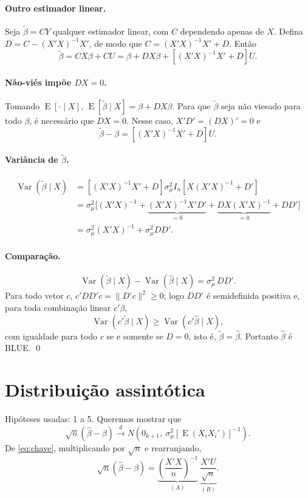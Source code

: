 \documentclass[12pt,a4paper]{article}
\newcommand{\E}{\operatorname{E}}
\newcommand{\Var}{\operatorname{Var}}
\newcommand{\convd}{\xrightarrow{\;d\;}}
\begin{document}
\paragraph{Outro estimador linear.} Seja $\tilde\beta=CY$ qualquer estimador linear, com $C$ dependendo apenas de $X$. Defina $D=C-(X'X)^{-1}X'$, de modo que $C=(X'X)^{-1}X'+D$. Então
\[
  \tilde\beta = CX\beta+CU=\beta+DX\beta+\left[(X'X)^{-1}X'+D\right]U .
\]

\paragraph{Não-viés impõe $DX=0$.} Tomando $\E[\cdot\mid X]$, $\E[\tilde\beta\mid X]=\beta+DX\beta$. Para que $\tilde\beta$ seja não viesado para todo $\beta$, é necessário que $DX=0$. Nesse caso, $X'D'=(DX)'=0$ e
\[
  \tilde\beta-\beta=\left[(X'X)^{-1}X'+D\right]U .
\]

\paragraph{Variância de $\tilde\beta$.}
\begin{align*}
  \Var(\tilde\beta\mid X)
  &=\left[(X'X)^{-1}X'+D\right]\sigma_\mu^2 I_n\left[X(X'X)^{-1}+D'\right]\\
  &=\sigma_\mu^2\Big[(X'X)^{-1}+\underbrace{(X'X)^{-1}X'D'}_{=0}+\underbrace{DX(X'X)^{-1}}_{=0}+DD'\Big]\\
  &=\sigma_\mu^2(X'X)^{-1}+\sigma_\mu^2DD'.
\end{align*}

\paragraph{Comparação.}
\[
  \Var(\tilde\beta\mid X)-\Var(\hat\beta\mid X)=\sigma_\mu^2\,DD'.
\]
Para todo vetor $c$, $c'DD'c=\lVert D'c\rVert^2\ge0$; logo $DD'$ é semidefinida positiva e, para toda combinação linear $c'\beta$,
\[
  \Var(c'\tilde\beta\mid X)\ge\Var(c'\hat\beta\mid X),
\]
com igualdade para todo $c$ se e somente se $D=0$, isto é, $\tilde\beta=\hat\beta$. Portanto $\hat\beta$ é BLUE. \qed

\section{Distribuição assintótica}
Hipóteses usadas: 1 a 5. Queremos mostrar que
\[
  \sqrt n(\hat\beta-\beta)\convd N\!\left(0_{k+1},\ \sigma_\mu^2[\E(X_iX_i')]^{-1}\right).
\]
De \eqref{eq:chave}, multiplicando por $\sqrt n$ e rearranjando,
\[
  \sqrt n(\hat\beta-\beta)=\underbrace{\left(\frac{X'X}{n}\right)^{-1}}_{(A)}\ \underbrace{\frac{X'U}{\sqrt n}}_{(B)} .
\]
\end{document}
